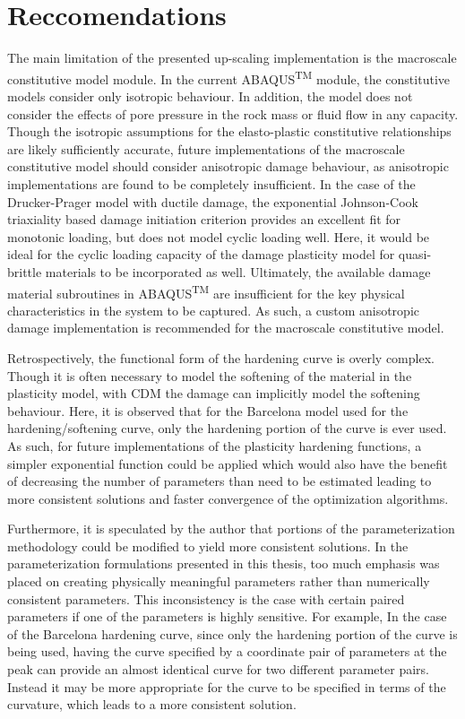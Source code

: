 \section{Reccomendations}

The main limitation of the presented up-scaling implementation is the macroscale constitutive model module. In the current ABAQUS\textsuperscript{TM} module, the constitutive models consider only isotropic behaviour. In addition, the model does not consider the effects of pore pressure in the rock mass or fluid flow in any capacity. Though the isotropic assumptions for the elasto-plastic constitutive relationships are likely sufficiently accurate, future implementations of the macroscale constitutive model should consider anisotropic damage behaviour, as anisotropic implementations are found to be completely insufficient. In the case of the Drucker-Prager model with ductile damage, the exponential Johnson-Cook triaxiality based damage initiation criterion provides an excellent fit for monotonic loading, but does not model cyclic loading well. Here, it would be ideal for the cyclic loading capacity of the damage plasticity model for quasi-brittle materials to be incorporated as well. Ultimately, the available damage material subroutines in ABAQUS\textsuperscript{TM} are insufficient for the key physical characteristics in the system to be captured. As such, a custom anisotropic damage implementation is recommended for the macroscale constitutive model.

Retrospectively, the functional form of the hardening curve is overly complex. Though it is often necessary to model the softening of the material in the plasticity model, with CDM the damage can implicitly model the softening behaviour. Here, it is observed that for the Barcelona model used for the hardening/softening curve, only the hardening portion of the curve is ever used. As such, for future implementations of the plasticity hardening functions, a simpler exponential function could be applied which would also have the benefit of decreasing the number of parameters than need to be estimated leading to more consistent solutions and faster convergence of the optimization algorithms. 

Furthermore, it is speculated by the author that portions of the parameterization methodology could be modified to yield more consistent solutions. In the parameterization formulations presented in this thesis, too much emphasis was placed on creating physically meaningful parameters rather than numerically consistent parameters. This inconsistency is the case with certain paired parameters if one of the parameters is highly sensitive. For example, In the case of the Barcelona hardening curve, since only the hardening portion of the curve is being used, having the curve specified by a coordinate pair of parameters at the peak can provide an almost identical curve for two different parameter pairs. Instead it may be more appropriate for the curve to be specified in terms of the curvature, which leads to a more consistent solution.

